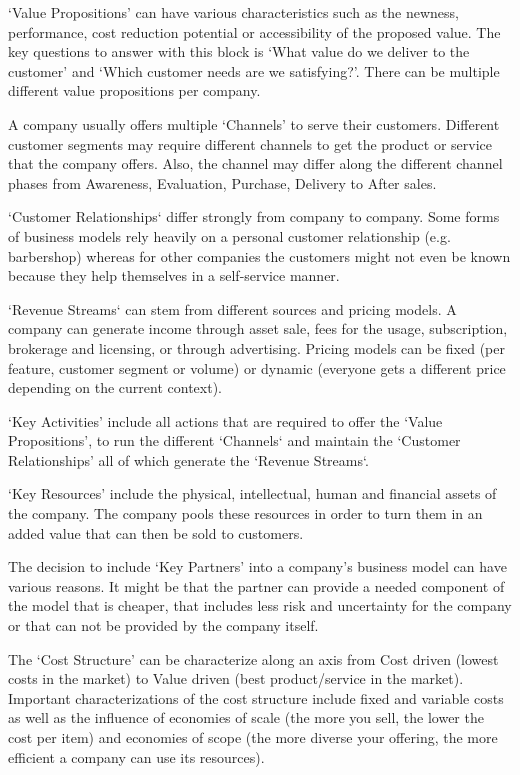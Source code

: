 		`Value Propositions' can have various characteristics such as the newness, performance, cost reduction potential or accessibility of the proposed value. The key questions to answer with this block is `What value do we deliver to the customer' and `Which customer needs are we satisfying?'. There can be multiple different value propositions per company.

		A company usually offers multiple `Channels' to serve their customers. Different customer segments may require different channels to get the product or service that the company offers. Also, the channel may differ along the different channel phases from Awareness, Evaluation, Purchase, Delivery to After sales.

		`Customer Relationships` differ strongly from company to company. Some forms of business models rely heavily on a personal customer relationship (e.g. barbershop) whereas for other companies the customers might not even be known because they help themselves in a self-service manner.

		`Revenue Streams` can stem from different sources and pricing models. A company can generate income through asset sale, fees for the usage, subscription, brokerage and licensing, or through advertising. Pricing models can be fixed (per feature, customer segment or volume) or dynamic (everyone gets a different price depending on the current context).
 
		`Key Activities' include all actions that are required to offer the `Value Propositions', to run the different `Channels` and maintain the `Customer Relationships' all of which generate the `Revenue Streams`.

		`Key Resources' include the physical, intellectual, human and financial assets of the company. The company pools these resources in order to turn them in an added value that can then be sold to customers.

		The decision to include `Key Partners' into a company's business model can have various reasons. It might be that the partner can provide a needed component of the model that is cheaper, that includes less risk and uncertainty for the company or that can not be provided by the company itself.

		The `Cost Structure' can be characterize along an axis from Cost driven (lowest costs in the market) to Value driven (best product/service in the market). Important characterizations of the cost structure include fixed and variable costs as well as the influence of economies of scale (the more you sell, the lower the cost per item) and economies of scope (the more diverse your offering, the more efficient a company can use its resources).	

